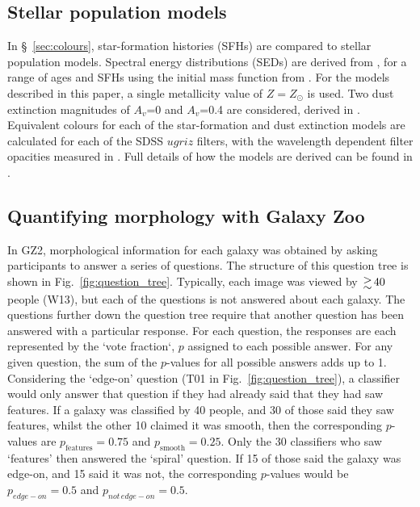 \documentclass[useAMS,usenatbib]{mn2e}
\begin{document}
\subsection{Stellar population models}
\label{sec:SEDs}

In \S~\ref{sec:colours}, star-formation histories (SFHs) are compared to stellar population models. Spectral energy distributions (SEDs) are derived from \citet{BC_03}, for a range of ages and SFHs using the initial mass function from \citet{Chabrier_03}. For the models described in this paper, a single metallicity value of $Z=Z_{\odot}$ is used. Two dust extinction magnitudes of $A_v$=0 and $A_v$=0.4 are considered, derived in \citet{Calzetti_00}. Equivalent colours for each of the star-formation and dust extinction models are calculated for each of the SDSS $ugriz$ filters, with the wavelength dependent filter opacities measured in \citet{Doi_10}. Full details of how the models are derived can be found in \citet{Duncan_14}.
\subsection{Quantifying morphology with Galaxy Zoo}
\label{sec:gz_morphologies}

In GZ2, morphological information for each galaxy was obtained by asking participants to answer a series of questions. The structure of this question tree is shown in Fig.~\ref{fig:question_tree}. Typically, each image was viewed by $\ga 40$ people (W13), but each of the questions is not answered about each galaxy. The questions further down the question tree require that another question has been answered with a particular response. For each question, the responses are each represented by the `vote fraction`, $p$ assigned to each possible answer. For any given question, the sum of the $p$-values for all possible answers adds up to 1. Considering the `edge-on' question (T01 in Fig.~\ref{fig:question_tree}), a classifier would only answer that question if they had already said that they had saw features. If a galaxy was classified by 40 people, and 30 of those said they saw features, whilst the other 10 claimed it was smooth, then the corresponding $p$-values are $p_{\mathrm{features}}=0.75$ and $p_\mathrm{{smooth}}=0.25$. Only the 30 classifiers who saw `features' then answered the `spiral' question. If 15 of those said the galaxy was edge-on, and 15 said it was not, the corresponding $p$-values would be $p_{edge-on}=0.5$ and $p_{not \, edge-on}=0.5$. 
\end{document}
